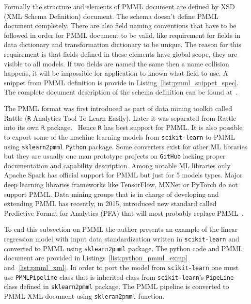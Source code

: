 \documentclass[english, 12pt, a4paper, elec, utf8, online]{aaltothesis}
\begin{document}
Formally the structure and elements of PMML document are defined by XSD (XML Schema Definition) document. The schema doesn't define PMML document completely. There are also field naming conventions that have to be followed in order for PMML document to be valid, like requirement for fields in data dictionary and transformation dictionary to be unique. The reason for this requirement is that fields defined in these elements have global scope, they are visible to all models. If two fields are named the same then a name collision happens, it will be impossible for application to known what field to use. A snippet from PMML definition is provide in Listing~\ref{list:pmml_snippet_spec}. The complete document description of the schema definition can be found at~\cite{pmml_xsd_schema}.



The PMML format was first introduced as part of data mining toolkit called Rattle (\texttt{R} Analytics Tool To Learn Easily). Later it was separated from Rattle into its own \texttt{R} package.~\cite{guazzelli2009pmml} Hence \texttt{R} has best support for PMML. It is also possible to export some of the machine learning models from \texttt{scikit-learn} to PMML using \texttt{sklearn2pmml} \texttt{Python} package. Some converters exist for other ML libraries but they are usually one man prototype projects on \texttt{GitHub} lacking proper documentation and capability description. Among notable ML libraries only Apache Spark has official support for PMML but just for 5 models types. Major deep learning libraries frameworks like TensorFlow, MXNet or PyTorch do not support PMML. Data mining groups that is in charge of developing and extending PMML has recently, in 2015, introduced new standard called Predictive Format for Analytics (PFA) that will most probably replace PMML~\cite{pfa}.  



To end this subsection on PMML the author presents an example of the linear regression model with input data standardization written in \texttt{scikit-learn} and converted to PMML using \texttt{sklearn2pmml} package. The python code and PMML document are provided in Listings~\ref{list:python_pmml_exmp} and~\ref{list:pmml_xml}. In order to port the model from \texttt{scikit-learn} one must use \texttt{PMMLPipeline} class that is inherited class from \texttt{scikit-learn}'s \texttt{PipeLine} class defined in \texttt{sklearn2pmml} package. The PMML pipeline is converted to PMML XML document using \texttt{skleran2pmml} function. 
\end{document}

